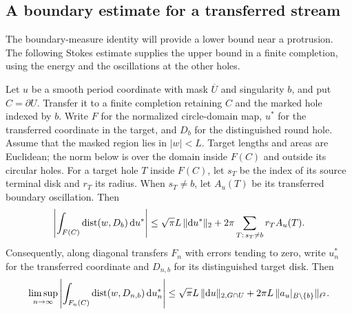 \subsection{A boundary estimate for a transferred stream}

The boundary-measure identity will provide a lower bound near a
protrusion.  The following Stokes estimate supplies the upper bound in
a finite completion, using the energy and the oscillations at the
other holes.

\begin{lemma}\label{lem:stream-stokes}
Let $u$ be a smooth period coordinate with mask $\overline U$ and
singularity $b$, and put $C=\partial U$.  Transfer it to a finite
completion retaining $C$ and the marked hole indexed by $b$.  Write
$F$ for the normalized circle-domain map, $u^*$ for the transferred
coordinate in the target, and $D_b$ for the distinguished round hole.
Assume that the masked region lies in $|w|<L$.  Target lengths and areas
are Euclidean; the norm below is over the domain inside $F(C)$ and
outside its circular holes.  For a target hole $T$ inside
$F(C)$, let $s_T$ be the index of its source terminal disk and $r_T$
its radius.  When $s_T\ne b$, let $A_u(T)$ be its transferred boundary
oscillation.  Then
\begin{equation}\label{eq:stream-stokes}
 \left|\int_{F(C)}\operatorname{dist}(w,D_b)\,\mathrm d u^*\right|
 \le \sqrt\pi L\,\|\mathrm d u^*\|_2
       +2\pi\sum_{T:\,s_T\ne b}r_TA_u(T).
\end{equation}
Consequently, along diagonal transfers $F_n$ with errors tending to zero,
write $u_n^*$ for the transferred coordinate and $D_{n,b}$ for its
distinguished target disk.  Then
\begin{equation}\label{eq:stream-stokes-asymptotic}
 \limsup_{n\to\infty}
 \left|\int_{F_n(C)}\operatorname{dist}(w,D_{n,b})\,\mathrm d u_n^*\right|
 \le \sqrt\pi L\,\|\mathrm d u\|_{2,G\cap U}
       +2\pi L\,\|a_u|_{B\setminus\{b\}}\|_{\ell^2}.
\end{equation}
\end{lemma}

